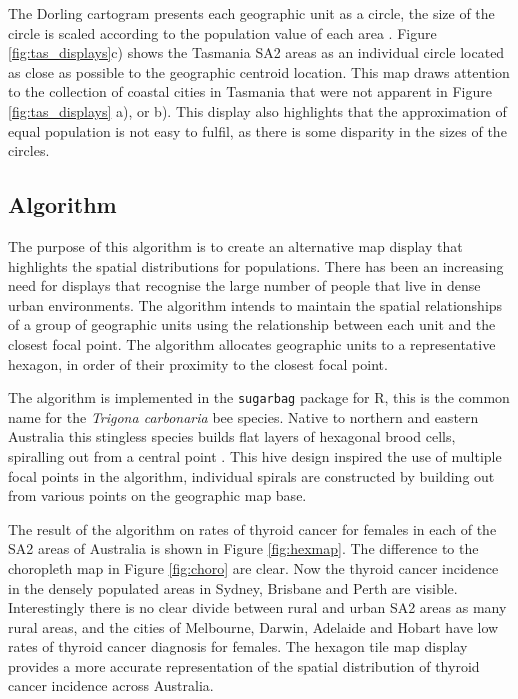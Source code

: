 The Dorling cartogram presents each geographic unit as a circle, the
size of the circle is scaled according to the population value of each
area \citep{ACTUC}. Figure \ref{fig:tas_displays}c) shows the Tasmania
SA2 areas as an individual circle located as close as possible to the
geographic centroid location. This map draws attention to the collection
of coastal cities in Tasmania that were not apparent in Figure
\ref{fig:tas_displays} a), or b). This display also highlights that the
approximation of equal population is not easy to fulfil, as there is
some disparity in the sizes of the circles.

\hypertarget{algorithm}{%
\subsection{Algorithm}\label{algorithm}}

The purpose of this algorithm is to create an alternative map display
that highlights the spatial distributions for populations. There has
been an increasing need for displays that recognise the large number of
people that live in dense urban environments. The algorithm intends to
maintain the spatial relationships of a group of geographic units using
the relationship between each unit and the closest focal point. The
algorithm allocates geographic units to a representative hexagon, in
order of their proximity to the closest focal point.

The algorithm is implemented in the \texttt{sugarbag} package for R,
this is the common name for the \emph{Trigona carbonaria} bee species.
Native to northern and eastern Australia this stingless species builds
flat layers of hexagonal brood cells, spiralling out from a central
point \citep{PH}. This hive design inspired the use of multiple focal
points in the algorithm, individual spirals are constructed by building
out from various points on the geographic map base.

The result of the algorithm on rates of thyroid cancer for females in
each of the SA2 areas of Australia is shown in Figure \ref{fig:hexmap}.
The difference to the choropleth map in Figure \ref{fig:choro} are
clear. Now the thyroid cancer incidence in the densely populated areas
in Sydney, Brisbane and Perth are visible. Interestingly there is no
clear divide between rural and urban SA2 areas as many rural areas, and
the cities of Melbourne, Darwin, Adelaide and Hobart have low rates of
thyroid cancer diagnosis for females. The hexagon tile map display
provides a more accurate representation of the spatial distribution of
thyroid cancer incidence across Australia.

